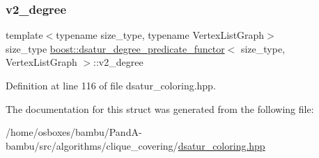 \mbox{\label{structboost_1_1dsatur__degree__predicate__functor_ac51a2be0b98d710913449b982d47909b}} 
\subsubsection{\texorpdfstring{v2\+\_\+degree}{v2\_degree}}
{\footnotesize\ttfamily template$<$typename size\+\_\+type, typename Vertex\+List\+Graph$>$ \\
size\+\_\+type \hyperlink{structboost_1_1dsatur__degree__predicate__functor}{boost\+::dsatur\+\_\+degree\+\_\+predicate\+\_\+functor}$<$ size\+\_\+type, Vertex\+List\+Graph $>$\+::v2\+\_\+degree\hspace{0.3cm}{\ttfamily [private]}}



Definition at line 116 of file dsatur\+\_\+coloring.\+hpp.



The documentation for this struct was generated from the following file\+:\begin{DoxyCompactItemize}
\item 
/home/osboxes/bambu/\+Pand\+A-\/bambu/src/algorithms/clique\+\_\+covering/\hyperlink{dsatur__coloring_8hpp}{dsatur\+\_\+coloring.\+hpp}\end{DoxyCompactItemize}
